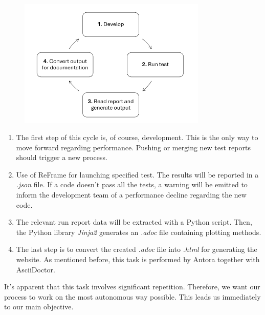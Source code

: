 \documentclass[12pt]{article}
\begin{document}
\begin{figure}[h]
    \centering
    \includegraphics[width=0.8\textwidth]{../illustrations/process.png}
\end{figure}

\newpage
\begin{enumerate}
    \item The first step of this cycle is, of course, development. This is the only way to move forward regarding performance. Pushing or merging new test reports should trigger a new process.
    \item Use of ReFrame for launching specified test. The results will be reported in a \textit{.json} file. If a code doesn't pass all the tests, a warning will be emitted to inform the development team of a performance decline regarding the new code.
    \item The relevant run report data will be extracted with a Python script. Then, the Python library \textit{Jinja2}\cite*{Jinja2}  generates an \textit{.adoc} file containing plotting methods.
    \item The last step is to convert the created \textit{.adoc} file into \textit{.html} for generating the website. As mentioned before, this task is performed by Antora together with AsciiDoctor.
    \end{enumerate}

It's apparent that this task involves significant repetition. Therefore, we want our process to work on the most autonomous way possible. This leads us immediately to our main objective.
\end{document}
